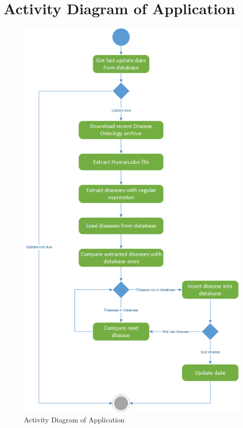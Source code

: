 \chapter{Activity Diagram of Application}
\label{Anhang_AktivDiaRUBBauteilerkennung}
\begin{figure}[H]
\centering
\includegraphics[scale=0.75]{bilder/Aktivitaetsdiagramm_Grundliegenderablauf.png}
\caption{Activity Diagram of Application}
\end{figure}

